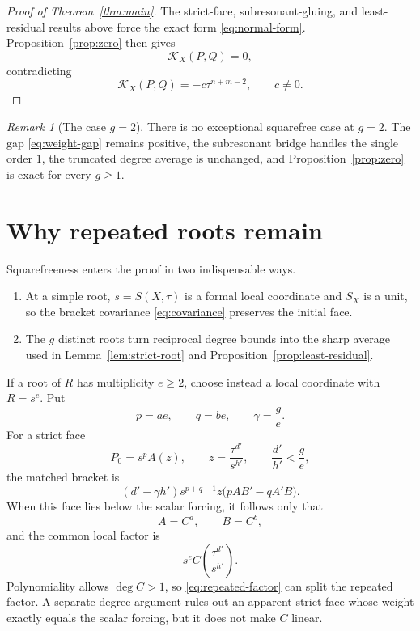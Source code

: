 \documentclass[11pt]{article}
\theoremstyle{definition}
\theoremstyle{remark}
\newtheorem{remark}[theorem]{Remark}
\newcommand{\KX}{\mathcal K_X}
\begin{document}
\begin{proof}[Proof of Theorem~\ref{thm:main}]
The strict-face, subresonant-gluing, and least-residual results above
force the exact form \eqref{eq:normal-form}.
Proposition~\ref{prop:zero} then gives
\[
 \KX(P,Q)=0,
\]
contradicting
\[
 \KX(P,Q)=-c\tau^{n+m-2},\qquad c\neq0.
\]
\end{proof}

\begin{remark}[The case \(g=2\)]
There is no exceptional squarefree case at \(g=2\).
The gap \eqref{eq:weight-gap} remains positive, the subresonant bridge
handles the single order \(1\), the truncated degree average is
unchanged, and Proposition~\ref{prop:zero} is exact for every
\(g\geq1\).
\end{remark}

\section{Why repeated roots remain}
\label{sec:repeated}

Squarefreeness enters the proof in two indispensable ways.

\begin{enumerate}[label=(\roman*)]
\item At a simple root, \(s=S(X,\tau)\) is a formal local coordinate
  and \(S_X\) is a unit, so the bracket covariance
  \eqref{eq:covariance} preserves the initial face.
\item The \(g\) distinct roots turn reciprocal degree bounds into the
  sharp average used in Lemma~\ref{lem:strict-root} and
  Proposition~\ref{prop:least-residual}.
\end{enumerate}

If a root of \(R\) has multiplicity \(e\geq2\), choose instead a local
coordinate with \(R=s^e\).  Put
\[
 p=ae,\qquad q=be,\qquad \gamma=\frac ge.
\]
For a strict face
\[
 P_0=s^pA(z),\qquad z=\frac{\tau^{d'}}{s^{h'}},
\qquad \frac{d'}{h'}<\frac ge,
\]
the matched bracket is
\[
 (d'-\gamma h')s^{p+q-1}z
 \bigl(pAB'-qA'B\bigr).
\]
When this face lies below the scalar forcing, it follows only that
\[
 A=C^a,\qquad B=C^b,
\]
and the common local factor is
\begin{equation}
 s^eC\!\left(\frac{\tau^{d'}}{s^{h'}}\right).
\label{eq:repeated-factor}
\end{equation}
Polynomiality allows \(\deg C>1\), so
\eqref{eq:repeated-factor} can split the repeated factor.  A separate
degree argument rules out an apparent strict face whose weight exactly
equals the scalar forcing, but it does not make \(C\) linear.
\end{document}
